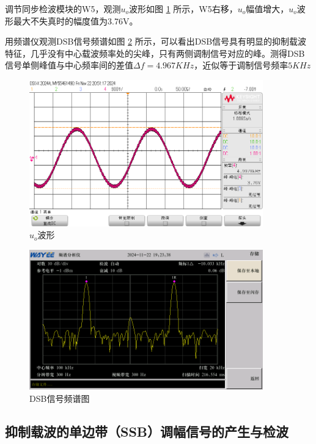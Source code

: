 \documentclass[UTF8]{ctexart}
\begin{document}
调节同步检波模块的W5，观测$u_o$波形如图 \ref{fig:22} 所示，W5右移，$u_o$幅值增大，$u_o$波形最大不失真时的幅度值为3.76V。

用频谱仪观测DSB信号频谱如图 \ref{fig:23} 所示，可以看出DSB信号具有明显的抑制载波特征，几乎没有中心载波频率处的尖峰，只有两侧调制信号对应的峰。测得DSB信号单侧峰值与中心频率间的差值$\Delta f=4.967KHz$，近似等于调制信号频率$5KHz$
\begin{figure}[H]
    \centering
    \includegraphics[width=0.9\textwidth]{pics/22.png}
    \caption{$u_o$波形}\label{fig:22}
\end{figure}
\begin{figure}[H]
    \centering
    \includegraphics[width=0.9\textwidth]{pics/23.png}
    \caption{DSB信号频谱图}\label{fig:23}
\end{figure}
\subsection{抑制载波的单边带（SSB）调幅信号的产生与检波}
\end{document}
